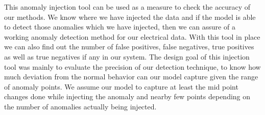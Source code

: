 This anomaly injection tool can be used as a measure to check the accuracy of our methods. We know where we have injected the data and if the model is able to detect those anomalies which we have injected, then we can assure of a working anomaly detection method for our electrical data. With this tool in place we can also find out the number of false positives, false negatives, true positives as well as true negatives if any in our system. The design goal of this injection tool was mainly to evaluate the precision of our detection technique, to know how much deviation from the normal behavior can our model capture given the range of anomaly points. We assume our model to capture at least the mid point changes done while injecting the anomaly and nearby few points depending on the number of anomalies actually being injected.



